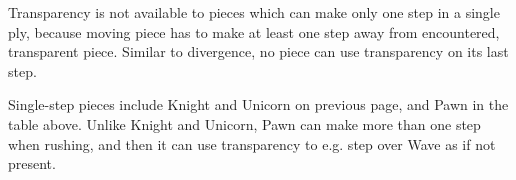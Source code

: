 
Transparency is not available to pieces which can make only one step in a single
ply, because moving piece has to make at least one step away from encountered,
transparent piece. Similar to divergence, no piece can use transparency on its
last step.

Single-step pieces include Knight and Unicorn on previous page, and Pawn in the
table above. Unlike Knight and Unicorn, Pawn can make more than one step when
rushing, and then it can use transparency to e.g. step over Wave as if not
present.

\clearpage %

